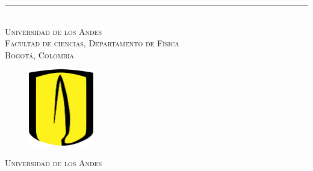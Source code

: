 \begin{titlepage}
\vspace{2cm}
\rule{400pt}{0.4pt}\\
\textsc{Universidad de los Andes} \\
\textsc{Facultad de ciencias, Departamento de Física}\\
\textsc{Bogotá, Colombia}

 
\newpage




\begin{figure}[!h]
    \centering
    \includegraphics[width=80pt]{logo.png}
    \label{fig:my_label}
\end{figure}


\textsc{\LARGE Universidad de los Andes}\\[2 cm] %


\end{titlepage}
